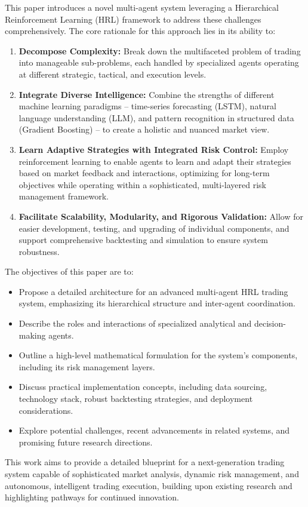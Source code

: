 \documentclass[11pt,a4paper]{article}
\begin{document}
This paper introduces a novel multi-agent system leveraging a Hierarchical Reinforcement Learning (HRL) framework to address these challenges comprehensively. The core rationale for this approach lies in its ability to:
\begin{enumerate}
\item  \textbf{Decompose Complexity:} Break down the multifaceted problem of trading into manageable sub-problems, each handled by specialized agents operating at different strategic, tactical, and execution levels.
\item  \textbf{Integrate Diverse Intelligence:} Combine the strengths of different machine learning paradigms – time-series forecasting (LSTM), natural language understanding (LLM), and pattern recognition in structured data (Gradient Boosting) – to create a holistic and nuanced market view.
\item  \textbf{Learn Adaptive Strategies with Integrated Risk Control:} Employ reinforcement learning to enable agents to learn and adapt their strategies based on market feedback and interactions, optimizing for long-term objectives while operating within a sophisticated, multi-layered risk management framework.
\item  \textbf{Facilitate Scalability, Modularity, and Rigorous Validation:} Allow for easier development, testing, and upgrading of individual components, and support comprehensive backtesting and simulation to ensure system robustness.

\end{enumerate}
The objectives of this paper are to:
\begin{itemize}
\item   Propose a detailed architecture for an advanced multi-agent HRL trading system, emphasizing its hierarchical structure and inter-agent coordination.
\item   Describe the roles and interactions of specialized analytical and decision-making agents.
\item   Outline a high-level mathematical formulation for the system's components, including its risk management layers.
\item   Discuss practical implementation concepts, including data sourcing, technology stack, robust backtesting strategies, and deployment considerations.
\item   Explore potential challenges, recent advancements in related systems, and promising future research directions.

\end{itemize}
This work aims to provide a detailed blueprint for a next-generation trading system capable of sophisticated market analysis, dynamic risk management, and autonomous, intelligent trading execution, building upon existing research and highlighting pathways for continued innovation.
\end{document}
